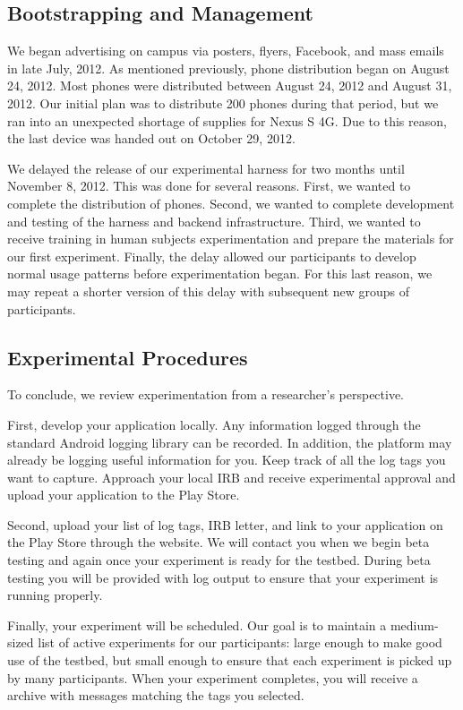 

\subsection{Bootstrapping and Management}

We began advertising \PhoneLab{} on campus via posters, flyers, Facebook, and
mass emails in late July, 2012. As mentioned previously, \PhoneLab{} phone
distribution began on August 24, 2012. Most phones were distributed between
August 24, 2012 and August 31, 2012. Our initial plan was to distribute 200
phones during that period, but we ran into an unexpected shortage of
supplies for Nexus S 4G. Due to this reason, the last device was handed out on
October 29, 2012.

We delayed the release of our experimental harness for two months until
November 8, 2012. This was done for several reasons. First, we wanted to
complete the distribution of phones. Second, we wanted to complete development
and testing of the harness and backend infrastructure. Third, we wanted to
receive training in human subjects experimentation and prepare the materials for
our first experiment. Finally, the delay allowed our participants to develop
normal usage patterns before experimentation began. For this last reason, we may
repeat a shorter version of this delay with subsequent new groups of \PhoneLab{}
participants.



\subsection{Experimental Procedures}

To conclude, we review \PhoneLab{} experimentation from a researcher's
perspective.

First, develop your application locally. Any information logged through the
standard Android logging library can be recorded. In addition, the platform may
already be logging useful information for you. Keep track of all the log tags
you want \PhoneLab{} to capture. Approach your local IRB and receive
experimental approval and upload your application to the Play Store.

Second, upload your list of log tags, IRB letter, and link to your
application on the Play Store through the \PhoneLab{} website. We will
contact you when we begin beta testing and again once your experiment is
ready for the testbed. During beta testing you will be provided with
\PhoneLab{} log output to ensure that your experiment is running properly.

Finally, your experiment will be scheduled. Our goal is to maintain a
medium-sized list of active experiments for our participants: large enough to
make good use of the testbed, but small enough to ensure that each experiment
is picked up by many participants. When your experiment completes, you will
receive a archive with messages matching the tags you selected.
